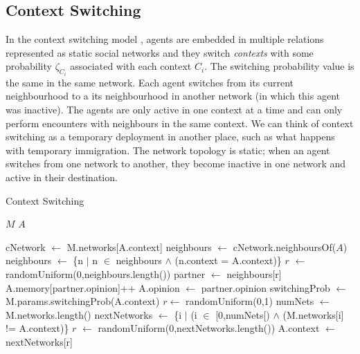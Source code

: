 \documentclass[preprint,number]{elsarticle}
\begin{document}
	
	\subsection{Context Switching}
	\label{sec:models_cs}
	In the context switching model \cite{Antunes2009}, agents are embedded in multiple relations represented as static social networks and they switch \textit{contexts} with some probability $\zeta_{C_i}$ associated with each context $C_i$. The switching probability value is the same in the same network. Each agent switches from its current neighbourhood to a its neighbourhood in another network (in which this agent was inactive). The agents are only active in one context at a time and can only perform encounters with neighbours in the same context. We can think of context switching as a temporary deployment in another place, such as what happens with temporary immigration. The network topology is static; when an agent switches from one network to another, they become inactive in one network and active in their destination. 
	\begin{algorithm}[H]
		\caption{Context Switching}
		\label{model:context_switching}
		\begin{algorithmic}
			\vspace{0.5em}
			\STATE $M$ 
			\STATE $A$ 
			\\ \hrulefill 
			
			\STATE{}
			\STATE cNetwork $\leftarrow$ M.networks[A.context]
			\STATE 
			\STATE {}
			\STATE neighbours $\leftarrow$ cNetwork.neighboursOf($A$) 
			\STATE {}
			\STATE neighbours $\leftarrow$ \{n $|$ n $\in$ neighbours $\wedge$ (n.context = A.context)\}
			\STATE
			\STATE{} 
			\STATE $r$ $\leftarrow$ randomUniform(0,neighbours.length())
			\STATE partner $\leftarrow$ neighbours[r]
			\STATE
			\STATE {}
			\STATE {}
			\STATE A.memory[partner.opinion]++
			\STATE A.opinion $\leftarrow$ partner.opinion
			\ENDIF
			\STATE
			\STATE {}
			\STATE switchingProb $\leftarrow$ M.params.switchingProb(A.context)
			\STATE $r \leftarrow $ randomUniform(0,1)
			\STATE numNets $\leftarrow$ M.networks.length()
			\STATE nextNetworks $\leftarrow$ \{i $|$ (i $\in$ [0,numNets[) $\wedge$ (M.networks[i] != A.context)\}
			\STATE $r$ $\leftarrow$ randomUniform(0,nextNetworks.length())
			\STATE A.context $\leftarrow$ nextNetworks[r]
			\ENDIF
		\end{algorithmic}
	\end{algorithm}
\end{document}
